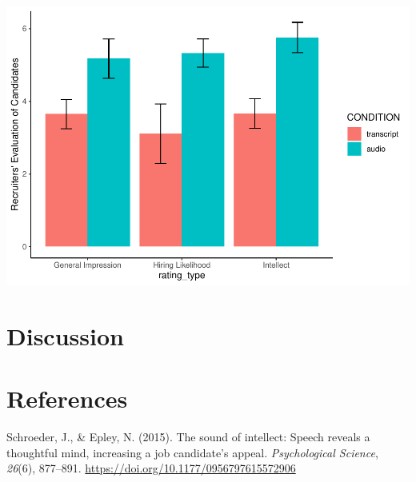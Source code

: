 \documentclass[
  english,
  man]{apa6}
\begin{document}
\includegraphics{APAreport_files/figure-latex/unnamed-chunk-3-1.pdf}

\hypertarget{discussion}{%
\section{Discussion}\label{discussion}}

\newpage

\hypertarget{references}{%
\section{References}\label{references}}

\begingroup
\setlength{\parindent}{-0.5in}
\setlength{\leftskip}{0.5in}

\hypertarget{refs}{}
\leavevmode\hypertarget{ref-schroeder_sound_2015}{}%
Schroeder, J., \& Epley, N. (2015). The sound of intellect: Speech reveals a thoughtful mind, increasing a job candidate's appeal. \emph{Psychological Science}, \emph{26}(6), 877--891. \url{https://doi.org/10.1177/0956797615572906}

\endgroup
\end{document}
